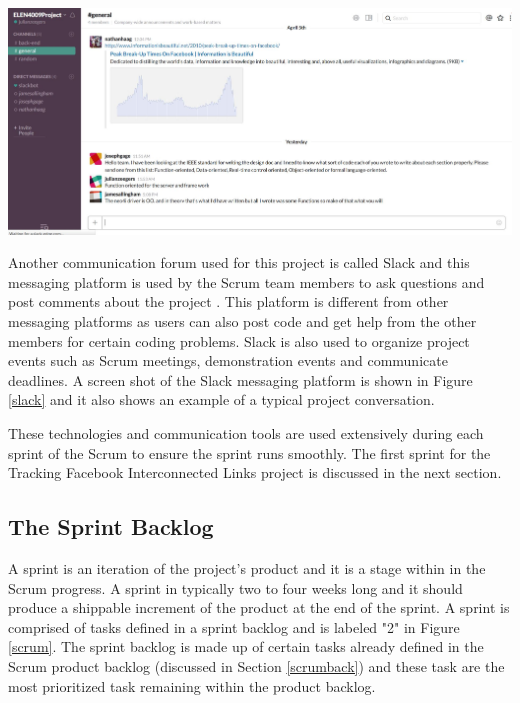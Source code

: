 \documentclass[12pt,onecolumn]{article}
\begin{document}
	\begin{center}
		\includegraphics[width=\textwidth]{slick}
		 \label{fig:slack}
	\end{center}
	
	Another communication forum used for this project is called Slack and this messaging platform is used by the Scrum team members to ask questions and post comments about the project \cite{slack}. This platform is different from other messaging platforms as users can also post code and get help from the other members for certain coding problems. Slack is also used to organize project events such as Scrum meetings, demonstration events and communicate deadlines. A screen shot of the Slack messaging platform is shown in Figure \ref{slack} and it also shows an example of a typical project conversation.
	
	
	
	These technologies and communication tools are used extensively during each sprint of the Scrum to ensure the sprint runs smoothly. The first sprint for the Tracking Facebook Interconnected Links project is discussed in the next section. 
	
	
	\subsection{The Sprint Backlog } \label{sprintback}
	A sprint is an iteration of the project's product and it is a stage within in the Scrum progress. A sprint in typically two to four weeks long and it should produce a shippable increment of the product at the end of the sprint. A sprint is comprised of tasks defined in a sprint backlog and is labeled "2" in Figure \ref{scrum}. The sprint backlog is made up of certain tasks already defined in the Scrum product backlog (discussed in Section \ref{scrumback}) and these task are the most prioritized task remaining within the product backlog. 
	
\end{document}
